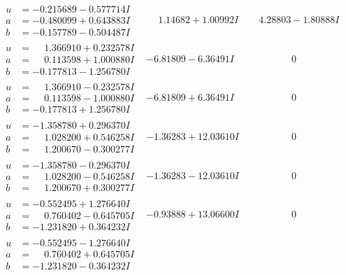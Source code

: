 \documentclass[1p]{elsarticle_modified}
\theoremstyle{definition}
\begin{document}
$$\begin{array}{c|c|c}
\begin{aligned}
u &= -0.215689 - 0.577714 I \\
a &= -0.480099 + 0.643883 I \\
b &= -0.157789 - 0.504487 I\end{aligned}
 & \phantom{-}1.14682 + 1.00992 I & \phantom{-}4.28803 - 1.80888 I \\ \hline\begin{aligned}
u &= \phantom{-}1.366910 + 0.232578 I \\
a &= \phantom{-}0.113598 + 1.000880 I \\
b &= -0.177813 - 1.256780 I\end{aligned}
 & -6.81809 - 6.36491 I & \phantom{-0.000000 } 0 \\ \hline\begin{aligned}
u &= \phantom{-}1.366910 - 0.232578 I \\
a &= \phantom{-}0.113598 - 1.000880 I \\
b &= -0.177813 + 1.256780 I\end{aligned}
 & -6.81809 + 6.36491 I & \phantom{-0.000000 } 0 \\ \hline\begin{aligned}
u &= -1.358780 + 0.296370 I \\
a &= \phantom{-}1.028200 + 0.546258 I \\
b &= \phantom{-}1.200670 - 0.300277 I\end{aligned}
 & -1.36283 + 12.03610 I & \phantom{-0.000000 } 0 \\ \hline\begin{aligned}
u &= -1.358780 - 0.296370 I \\
a &= \phantom{-}1.028200 - 0.546258 I \\
b &= \phantom{-}1.200670 + 0.300277 I\end{aligned}
 & -1.36283 - 12.03610 I & \phantom{-0.000000 } 0 \\ \hline\begin{aligned}
u &= -0.552495 + 1.276640 I \\
a &= \phantom{-}0.760402 - 0.645705 I \\
b &= -1.231820 + 0.364232 I\end{aligned}
 & -0.93888 + 13.06600 I & \phantom{-0.000000 } 0 \\ \hline\begin{aligned}
u &= -0.552495 - 1.276640 I \\
a &= \phantom{-}0.760402 + 0.645705 I \\
b &= -1.231820 - 0.364232 I\end{aligned}

\end{array}$$
\end{document}
